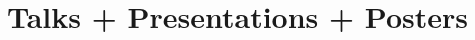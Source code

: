 \documentclass[letterpaper]{deedy-resume} %
\begin{document}

\section{Talks + Presentations + Posters}

 \vspace{0.1cm}

\end{document}
